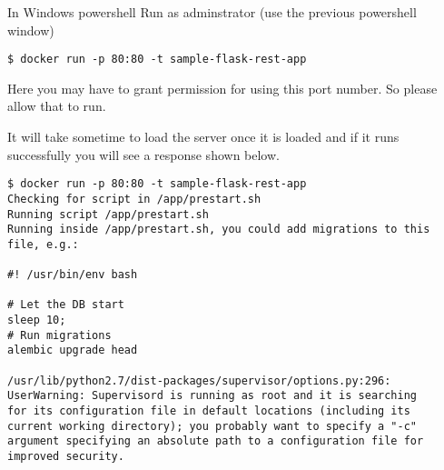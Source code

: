 In Windows powershell Run as adminstrator (use the previous powershell
window)

\begin{lstlisting}
$ docker run -p 80:80 -t sample-flask-rest-app
\end{lstlisting}

Here you may have to grant permission for using this port number. So
please allow that to run.

It will take sometime to load the server once it is loaded and if it
runs successfully you will see a response shown below.

\begin{lstlisting}[basicstyle=\footnotesize]
$ docker run -p 80:80 -t sample-flask-rest-app
Checking for script in /app/prestart.sh
Running script /app/prestart.sh
Running inside /app/prestart.sh, you could add migrations to this file, e.g.:

#! /usr/bin/env bash

# Let the DB start
sleep 10;
# Run migrations
alembic upgrade head

/usr/lib/python2.7/dist-packages/supervisor/options.py:296:
UserWarning: Supervisord is running as root and it is searching
for its configuration file in default locations (including its
current working directory); you probably want to specify a "-c"
argument specifying an absolute path to a configuration file for
improved security.


\end{lstlisting}
